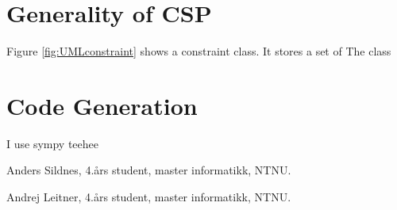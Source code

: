 \documentclass[journal]{IEEEtran}
\begin{document}
\section{Generality of CSP}
Figure \autoref{fig:UMLconstraint} shows a constraint class.
It stores a set of 
The class 


\section{Code Generation}
I use sympy teehee


\begin{IEEEbiographynophoto}{Anders Sildnes,}
    4.års student, master informatikk, NTNU.\
\end{IEEEbiographynophoto}
\begin{IEEEbiographynophoto}{Andrej Leitner,}
    4.års student, master informatikk, NTNU.\
\end{IEEEbiographynophoto}

    
%
%
%
%
%
% 
\end{document}
